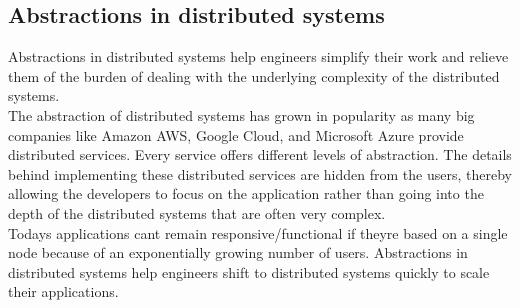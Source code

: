 \documentclass{article}
\begin{document}
\subsection{Abstractions in distributed systems}\label{test}

Abstractions in distributed systems help engineers simplify their work and relieve them of the burden of dealing with the underlying complexity of the distributed systems.
\\
The abstraction of distributed systems has grown in popularity as many big companies like Amazon AWS, Google Cloud, and Microsoft Azure provide distributed services. Every
service offers different levels of abstraction. The
details behind implementing these distributed services are hidden from the users, thereby allowing the developers to focus on the application rather than going into the depth of the distributed systems that are often very complex.
\\
Today\textquotesingle s applications can\textquotesingle t remain responsive/functional if they\textquotesingle re based on a single node because of an exponentially growing number of users. Abstractions
in distributed systems help engineers shift to distributed systems quickly to scale their applications.
\end{document}
